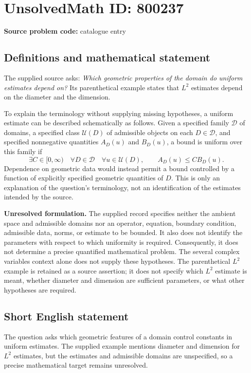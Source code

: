 \documentclass[11pt]{article}
\begin{document}
\section*{UnsolvedMath ID: 800237}
\textbf{Source problem code:} catalogue entry
\subsection{Definitions and mathematical statement}
The supplied source asks: \emph{Which geometric properties of the domain do uniform estimates depend on?} Its parenthetical example states that \(L^2\) estimates depend on the diameter and the dimension.

To explain the terminology without supplying missing hypotheses, a uniform estimate can be described schematically as follows. Given a specified family \(\mathcal D\) of domains, a specified class \(\mathcal U(D)\) of admissible objects on each \(D\in\mathcal D\), and specified nonnegative quantities \(A_D(u)\) and \(B_D(u)\), a bound is uniform over this family if
\[
\exists C\in[0,\infty)\quad\forall D\in\mathcal D\quad\forall u\in\mathcal U(D),\qquad A_D(u)\le C B_D(u).
\]
Dependence on geometric data would instead permit a bound controlled by a function of explicitly specified geometric quantities of \(D\). This is only an explanation of the question's terminology, not an identification of the estimates intended by the source.

\textbf{Unresolved formulation.} The supplied record specifies neither the ambient space and admissible domains nor an operator, equation, boundary condition, admissible data, norms, or estimate to be bounded. It also does not identify the parameters with respect to which uniformity is required. Consequently, it does not determine a precise quantified mathematical problem. The several complex variables context alone does not supply these hypotheses. The parenthetical \(L^2\) example is retained as a source assertion; it does not specify which \(L^2\) estimate is meant, whether diameter and dimension are sufficient parameters, or what other hypotheses are required.
\subsection{Short English statement}
The question asks which geometric features of a domain control constants in uniform estimates. The supplied example mentions diameter and dimension for \(L^2\) estimates, but the estimates and admissible domains are unspecified, so a precise mathematical target remains unresolved.
\end{document}
